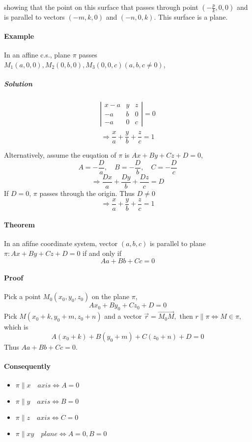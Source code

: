 \documentclass[UTF8]{ctexart}
\begin{document}
showing that the point on this surface that passes through point $(-\frac{p}{k},0,0)$
and is parallel to vectors $(-m,k,0)$ and $(-n,0,k)$. This
surface is a plane.

\paragraph{Example} In an affine c.s., plane $\pi$ passes 
$M_1(a,0,0),M_2(0,b,0),M_3(0,0,c)(a,b,c\neq 0)$,
\subparagraph{Solution}
$$
\begin{array}{lll}
  \left|\begin{array}{ccc}
  x-a & y & z \\
  -a & b & 0 \\
  -a & 0 & c
  \end{array}\right|=0 \\
  \end{array}
$$
$$
\Rightarrow \frac{x}{a}+\frac{y}{b}+\frac{z}{c}=1
$$

Alternatively, assume the euqation of $\pi$ is $Ax+By+Cz+D=0$,
$$
A=-\frac{D}{a}, \quad B=-\frac{D}{b}, \quad C=-\frac{D}{c}
$$
$$
 \Rightarrow \frac{Dx}{a}+\frac{Dy}{b}+\frac{Dz}{c}=D
$$
If $D=0$, $\pi$ passes through the origin.
Thus $D\neq 0$
$$
 \Rightarrow \frac{x}{a}+\frac{y}{b}+\frac{z}{c}=1
$$

\paragraph{Theorem} In an afifne coordinate system, vector $(a,b,c)$
is parallel to plane \\$\pi : Ax+By+Cz+D=0$ if and only if
$$
Aa+Bb+Cc=0
$$
\paragraph{Proof} 
Pick a point $M_{0}\left(x_{0}, y_{0}, z_{0}\right)$ on
the plane $\pi$, 
$$
A x_{0}+B y_{0}+C z_{0}+D=0
$$
Pick 
$M\left(x_{0}+k, y_{0}+m, z_{0}+n\right)$ 
and a vector $\vec r=\overrightarrow{M_{0} M},$ 
then $r\parallel \pi \iff M \in \pi,$ which is 
$$
A\left(x_{0}+k\right)+B\left(y_{0}+m\right)+C\left(z_{0}+n\right)+D=0
$$
Thus $A a+B b+C c=0 .$

\paragraph{Consequently}
\begin{itemize}
  \item $\pi \parallel x \quad axis \iff A=0$
  \item $\pi \parallel y \quad axis \iff B=0$
  \item $\pi \parallel z \quad axis \iff C=0$
  \item $\pi \parallel xy \quad plane \iff A=0,B=0$
\end{itemize}
\end{document}
